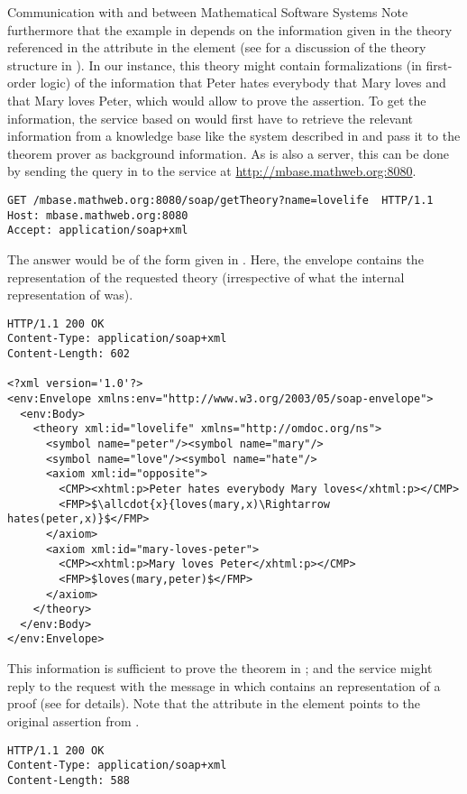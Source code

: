 \begin{tchapter}[id=rpc,short=Communication between Systems]{Communication with and between Mathematical Software Systems}
Note furthermore that the example in {} depends on the information
given in the theory {} referenced in the {}
attribute in the {} element (see {} for a
discussion of the theory structure in {\omdoc}). In our instance, this theory might
contain formalizations (in first-order logic) of the information that Peter hates
everybody that Mary loves and that Mary loves Peter, which would allow {\spass} to prove
the assertion. To get the information, the {\mathwebws} service based on {\spass} would
first have to retrieve the relevant information from a knowledge base like the {\mbase}
system described in {} and pass it to the {\spass} theorem prover as
background information. As {\mbase} is also a {\mathwebws} server, this can be done by
sending the query in {} to the {\mbase} service at
\url{http://mbase.mathweb.org:8080}.

\begin{lstlisting}[label=lst:rpc-getTheory,  
  caption={Requesting a Theory from {\mbase}}]
GET /mbase.mathweb.org:8080/soap/getTheory?name=lovelife  HTTP/1.1
Host: mbase.mathweb.org:8080
Accept: application/soap+xml
\end{lstlisting}
The answer would be of the form given in {}. Here, the
{\soap} envelope contains the {\omdoc} representation of the requested theory
(irrespective of what the internal representation of {\mbase} was).
\begin{lstlisting}[label=lst:rpc-theory,mathescape,
  caption={The Background Theory for Message {\ref{lst:rpc-prover}}}]
HTTP/1.1 200 OK
Content-Type: application/soap+xml
Content-Length: 602

<?xml version='1.0'?>
<env:Envelope xmlns:env="http://www.w3.org/2003/05/soap-envelope">
  <env:Body>
    <theory xml:id="lovelife" xmlns="http://omdoc.org/ns"> 
      <symbol name="peter"/><symbol name="mary"/> 
      <symbol name="love"/><symbol name="hate"/> 
      <axiom xml:id="opposite"> 
        <CMP><xhtml:p>Peter hates everybody Mary loves</xhtml:p></CMP> 
        <FMP>$\allcdot{x}{loves(mary,x)\Rightarrow hates(peter,x)}$</FMP> 
      </axiom> 
      <axiom xml:id="mary-loves-peter"> 
        <CMP><xhtml:p>Mary loves Peter</xhtml:p></CMP> 
        <FMP>$loves(mary,peter)$</FMP>
      </axiom>
    </theory>
  </env:Body>
</env:Envelope>
\end{lstlisting}
This information is sufficient to prove the theorem in {}; and the
{\spass} service might reply to the request with the message in {}
which contains an {\omdoc} representation of a proof (see {} for
details). Note that the {} attribute in the {}
element points to the original assertion from {}.
\begin{lstlisting}[label=lst:rpc-proof,mathescape,
  caption={A proof that Peter hates someone}]
HTTP/1.1 200 OK
Content-Type: application/soap+xml
Content-Length: 588


\end{lstlisting}
\end{tchapter}
